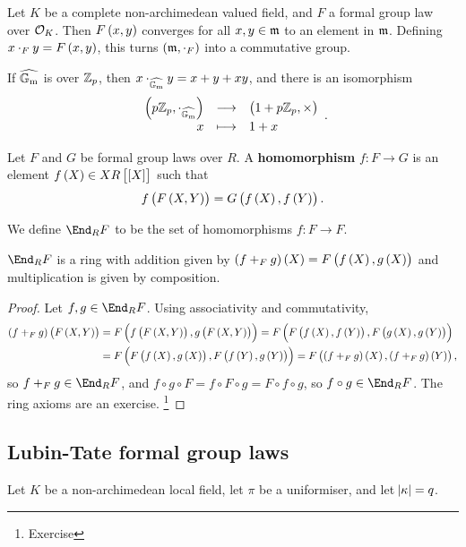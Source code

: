 Let $ K $ be a complete non-archimedean valued field, and $ F $ a formal group law over $ \mathcal{O}_K $. Then $ F\br{x, y} $ converges for all $ x, y \in \mathfrak{m} $ to an element in $ \mathfrak{m} $. Defining $ x \cdot_F y = F\br{x, y} $, this turns $ \br{\mmm, \cdot_F} $ into a commutative group.

\begin{example*}
If $ \widehat{\mathbb{G}_{\mathrm{m}}} $ is over $ \mathbb{Z}_p $, then $ x \cdot_{\widehat{\mathbb{G}_{\mathrm{m}}}} y = x + y + xy $, and there is an isomorphism
$$ \function{\br{p\ZZ_p, \cdot_{\widehat{\GG_\m}}}}{\br{1 + p\ZZ_p, \times}}{x}{1 + x}. $$
\end{example*}

\begin{definition}
Let $ F $ and $ G $ be formal group laws over $ R $. A \textbf{homomorphism} $ f : F \to G $ is an element $ f\br{X} \in XR\sbr{\sbr{X}} $ such that
$$ f\br{F\br{X, Y}} = G\br{f\br{X}, f\br{Y}}. $$
\end{definition}

We define $ \End_R F $ to be the set of homomorphisms $ f : F \to F $.

\begin{lemma}
$ \End_R F $ is a ring with addition given by $ \br{f +_F g}\br{X} = F\br{f\br{X}, g\br{X}} $ and multiplication is given by composition.
\end{lemma}

\begin{proof}
Let $ f, g \in \End_R F $. Using associativity and commutativity,
\begin{align*}
\br{f +_F g}\br{F\br{X, Y}}
& = F\br{f\br{F\br{X, Y}}, g\br{F\br{X, Y}}}
= F\br{F\br{f\br{X}, f\br{Y}}, F\br{g\br{X}, g\br{Y}}} \\
& = F\br{F\br{f\br{X}, g\br{X}}, F\br{f\br{Y}, g\br{Y}}}
= F\br{\br{f +_F g}\br{X}, \br{f +_F g}\br{Y}},
\end{align*}
so $ f +_F g \in \End_R F $, and $ f \circ g \circ F = f \circ F \circ g = F \circ f \circ g $, so $ f \circ g \in \End_R F $. The ring axioms are an exercise. \footnote{Exercise}
\end{proof}

\pagebreak

\subsection{Lubin-Tate formal group laws}

Let $ K $ be a non-archimedean local field, let $ \pi $ be a uniformiser, and let $ \abs{\kappa} = q $.

